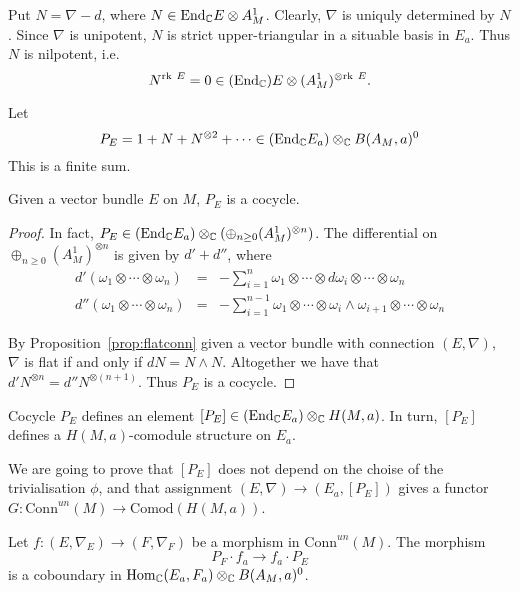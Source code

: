 Put $N= \nabla- d$, where $N \in \mathrm{End}_{\mathbb{C}} E \otimes A^1_M$. Clearly, $\nabla$ is uniquly determined by $N$.
Since $\nabla$ is unipotent, $N$ is strict upper-triangular in a situable basis in $E_a$. Thus $N$ is nilpotent, i.e.
\[
N^{\mathrm{rk}~ E} = 0 \in (\mathrm{End}_{\mathbb{C}}) E \otimes (A^1_M)^{\otimes \mathrm{rk}~ E}.
\]

\begin{defn}
Let
\[
P_E = 1 + N + N^{\otimes 2} + \cdots \in (\mathrm{End}_{\mathbb{C}}E_a) \otimes_{\mathbb{C}} B(A_M,a)^0
\]
This is a finite sum.
\end{defn}

\begin{prop}
Given a vector bundle $E$ on $M$, $P_E$ is a cocycle.
\end{prop}
\begin{proof}

In fact, $P_E\in (\mathrm{End}_{\mathbb{C}}E_a) \otimes_{\mathbb{C}}(\oplus_{n\geq 0} (A_M^1)^{\otimes n})$. The differential on $\oplus_{n\geq 0} (A_M^1)^{\otimes n}$ is given by $d'+d''$, where
\begin{eqnarray*}
d'(\omega_1 \otimes \cdots \otimes \omega_n) & = & -\sum_{i=1}^n \omega_1 \otimes \cdots \otimes d \omega_i \otimes \cdots \otimes \omega_n \\
d''(\omega_1 \otimes \cdots \otimes \omega_n) & = & - \sum_{i=1}^{n-1} \omega_1 \otimes \cdots \otimes \omega_i \wedge \omega_{i+1} \otimes \cdots \otimes \omega_n
\end{eqnarray*}

By Proposition~\ref{prop:flatconn} given a vector bundle with connection $(E,\nabla)$, $\nabla$ is flat if and only if $dN = N \wedge N$. Altogether we have that $d' N^{\otimes n} = d'' N^{\otimes (n+1)}$. Thus $P_E$ is a cocycle.
\end{proof}

\begin{defn}
Cocycle $P_E$ defines an element $[P_E]\in (\mathrm{End}_{\mathbb{C}}E_a) \otimes_{\mathbb{C}} H(M,a)$. In turn, $[P_E]$ defines a $H(M,a)$-comodule structure on $E_a$.
\end{defn}

We are going to prove that $[P_E]$ does not depend on the choise of the trivialisation $\phi$, and that assignment $(E,\nabla)\to (E_a,[P_E])$ gives a functor $G:\mathrm{Conn}^{un}(M)\to\mathrm{Comod}(H(M,a))$.

\begin{prop}
Let $f : (E, \nabla_E) \to (F, \nabla_F)$ be a morphism in $\mathrm{Conn}^{un}(M)$.
The morphism
\[
P_F \cdot f_a \to f_a \cdot P_E
\]
is a coboundary in $\mathrm{Hom}_{\mathbb{C}}(E_a,F_a) \otimes_{\mathbb{C}} B(A_M, a)^0$.
\end{prop}


